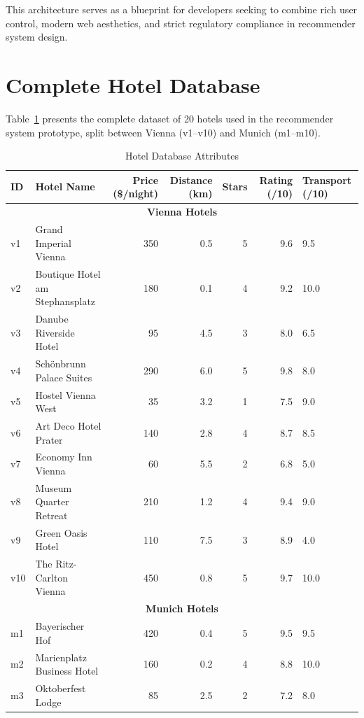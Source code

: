 \documentclass[acmlarge]{acmart}
\begin{document}
This architecture serves as a blueprint for developers seeking to combine rich user control, modern web aesthetics, and strict regulatory compliance in recommender system design.




\appendix

\section{Complete Hotel Database}
Table~\ref{tab:database} presents the complete dataset of 20 hotels used in the recommender system prototype, split between Vienna (v1--v10) and Munich (m1--m10).

\begin{table}[h]
  \caption{Hotel Database Attributes}
  \label{tab:database}
  \begin{tabular}{llrrrrl}
    \toprule
    ID & Hotel Name & Price (\$/night) & Distance (km) & Stars & Rating (/10) & Transport (/10) \\
    \midrule
    \multicolumn{7}{c}{\textbf{Vienna Hotels}} \\
    \midrule
    v1 & Grand Imperial Vienna & 350 & 0.5 & 5 & 9.6 & 9.5 \\
    v2 & Boutique Hotel am Stephansplatz & 180 & 0.1 & 4 & 9.2 & 10.0 \\
    v3 & Danube Riverside Hotel & 95 & 4.5 & 3 & 8.0 & 6.5 \\
    v4 & Schönbrunn Palace Suites & 290 & 6.0 & 5 & 9.8 & 8.0 \\
    v5 & Hostel Vienna West & 35 & 3.2 & 1 & 7.5 & 9.0 \\
    v6 & Art Deco Hotel Prater & 140 & 2.8 & 4 & 8.7 & 8.5 \\
    v7 & Economy Inn Vienna & 60 & 5.5 & 2 & 6.8 & 5.0 \\
    v8 & Museum Quarter Retreat & 210 & 1.2 & 4 & 9.4 & 9.0 \\
    v9 & Green Oasis Hotel & 110 & 7.5 & 3 & 8.9 & 4.0 \\
    v10 & The Ritz-Carlton Vienna & 450 & 0.8 & 5 & 9.7 & 10.0 \\
    \midrule
    \multicolumn{7}{c}{\textbf{Munich Hotels}} \\
    \midrule
    m1 & Bayerischer Hof & 420 & 0.4 & 5 & 9.5 & 9.5 \\
    m2 & Marienplatz Business Hotel & 160 & 0.2 & 4 & 8.8 & 10.0 \\
    m3 & Oktoberfest Lodge & 85 & 2.5 & 2 & 7.2 & 8.0 \\

\end{tabular}
\end{table}
\end{document}
